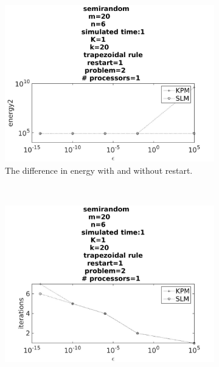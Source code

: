 
\begin{figure}[H]
        \centering
        \begin{subfigure}[b]{0.45\textwidth}
                \includegraphics[width=\textwidth]{../MATLAB/fig/compareEnergy2.jpg}
                \caption{ The difference in energy with and without restart. }
                \label{fig:compareEnergy}
        \end{subfigure}
        ~
        \begin{subfigure}[b]{0.45\textwidth}
                \includegraphics[width=\textwidth]{../MATLAB/fig/compareIter2.jpg}

\end{subfigure}
\end{figure}
